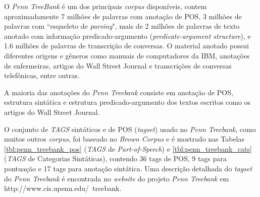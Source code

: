 O \emph{Penn TreeBank} é um dos principais \emph{corpus} disponíveis, contem aproximadamente 7 milhões de palavras com anotação de POS, 3 milhões de palavras com ``esqueleto de \emph{parsing}", mais de 2 milhões de palavras de texto anotado com informação predicado-argumento (\emph{predicate-argument structure}), e 1.6 milhões de palavras de transcrição de conversas. O material anotado possui diferentes origens e gêneros como manuais de computadores da IBM, anotações de enfermeiras, artigos do Wall Street Journal e transcrições de conversas telefônicas, entre outras.

A maioria das anotações do \emph{Penn Treebank} consiste em anotação de POS, estrutura sintática e estrutura predicado-argumento dos textos escritos como os artigos do Wall Street Journal.

O conjunto de \emph{TAGS} sintáticos e de POS (\emph{tagset}) usado no \emph{Penn Treebank}, como muitos outros \emph{corpus}, foi baseado no \emph{Brown Corpus} e é mostrado nas Tabelas \ref{tbl:penn_treebank_pos} (\emph{TAGS} de \emph{Part-of-Speech}) e \ref{tbl:penn_treebank_cats} (\emph{TAGS} de Categorias Sintáticas), contendo 36 tags de POS, 9 tags para pontuação e 17 tags para anotação sintática. Uma descrição detalhada do \emph{tagset} do \emph{Penn Treebank} é encontrada no \emph{website} do projeto \emph{Penn Treebank} em http://www.cis.upenn.edu/~treebank.


